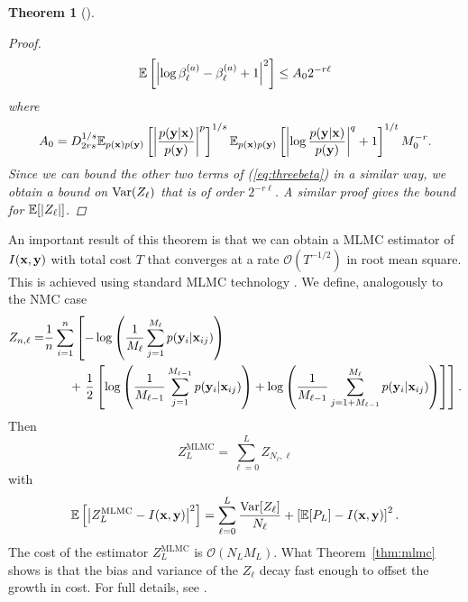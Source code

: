 \documentclass[a4paper, 10pt]{report}
\theoremstyle{plain}
\newtheorem{theorem}{Theorem}[chapter]
\begin{document}
\begin{theorem}[\citet{goda2020multilevel}]
\begin{proof}
			\begin{equation}
			\mathbb{E}\left[\left|\log \beta_\ell^{(a)}-\beta_\ell^{(a)} + 1\right|^2\right] \le A_0 2^{-r\ell}
			\end{equation}
			where
			\begin{equation}
			A_0 =  D_{2rs}^{1/s}\mathbb{E}_{p({\mathbf{x}})p({\mathbf{y}})}\left[\left|\frac{p({\mathbf{y}}|{\mathbf{x}})}{p({\mathbf{y}})} \right|^{p}\right]^{1/s} \mathbb{E}_{p({\mathbf{x}})p({\mathbf{y}})}\left[ \left|\log\frac{p({\mathbf{y}}|{\mathbf{x}})}{p({\mathbf{y}})}\right|^{q} + 1\right]^{1/t}M_0^{-r}.
			\end{equation}
			Since we can bound the other two terms of (\ref{eq:threebeta}) in a similar way, we obtain a bound on $\mathrm{Var}(Z_\ell)$ that is of order $2^{-r\ell}$. A similar proof gives the bound for $\mathbb{E}[|Z_\ell|]$.
		\end{proof}
	\end{theorem}
	An important result of this theorem is that we can obtain a MLMC estimator of $I({\mathbf{x}},{\mathbf{y}})$ with total cost $T$ that converges at a rate $\mathcal{O}(T^{-1/2})$ in root mean square. This is achieved using standard MLMC technology \citep{giles2008multilevel}.
	We define, analogously to the NMC case
	\begin{equation}
	\begin{split}
	Z_{n,\ell} = & \frac{1}{n}\sum_{i=1}^n \left[  -\log \left(\frac{1}{M_{\ell}} \sum_{j=1}^{M_{\ell}} p({\mathbf{y}}_i|{\mathbf{x}}_{ij})\right) \right .\\&\qquad+ \left. \frac{1}{2}\left[\log \left(\frac{1}{M_{\ell-1}} \sum_{j=1}^{M_{\ell-1}} p({\mathbf{y}}_i|{\mathbf{x}}_{ij})\right) + \log \left(\frac{1}{M_{\ell-1}} \sum_{j=1+M_{\ell-1}}^{M_{\ell}} p({\mathbf{y}}_i|{\mathbf{x}}_{ij})\right) \right]\right].
	\end{split}
	\end{equation}
	Then
	\begin{equation}
	Z^\text{MLMC}_L = \sum_{\ell=0}^L Z_{N_\ell,\ell}
	\end{equation}
	with
	\begin{equation}
	\mathbb{E}\left[\left|Z_L^{\text{MLMC}} - I({\mathbf{x}},{\mathbf{y}})\right|^2\right] = \sum_{\ell=0}^L \frac{\mathrm{Var}[Z_\ell]}{N_\ell} + \left[ \mathbb{E}[P_L] - I({\mathbf{x}},{\mathbf{y}})  \right]^2.
	\end{equation}
	The cost of the estimator $Z_L^\text{MLMC}$ is $\mathcal{O}(N_LM_L)$.
	What Theorem~\ref{thm:mlmc} shows is that the bias and variance of the $Z_\ell$ decay fast enough to offset the growth in cost.
	For full details, see \citet{goda2020multilevel}.
	
	
\end{document}
